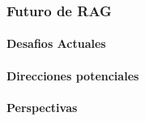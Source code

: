 \subsubsection{Futuro de RAG}

\paragraph{Desafios Actuales}


\paragraph{Direcciones potenciales}


\paragraph{Perspectivas}

